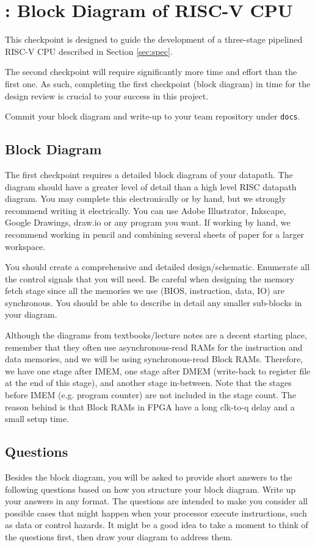 \section{\blockDiagramTaskName: Block Diagram of RISC-V CPU}

This checkpoint is designed to guide the development of a three-stage pipelined RISC-V CPU
described in Section \ref{sec:spec}.

The second checkpoint will require significantly more time and effort than the first one.
As such, completing the first checkpoint (block diagram) in time for the design review is crucial to your success in this project.

Commit your block diagram and write-up to your team repository under \verb|docs|.


\subsection{Block Diagram}
The first checkpoint requires a detailed block diagram of your datapath.
The diagram should have a greater level of detail than a high level RISC datapath diagram.
You may complete this electronically or by hand,
but we strongly recommend writing it electrically.
You can use Adobe Illustrator, Inkscape, Google Drawings, draw.io or any program you want.
If working by hand, we recommend working in pencil and combining several sheets of paper for a larger workspace.

You should create a comprehensive and detailed design/schematic.
Enumerate all the control signals that you will need.
Be careful when designing the memory fetch stage
since all the memories we use (BIOS, instruction, data, IO) are synchronous.
You should be able to describe in detail any smaller sub-blocks in your diagram.

Although the diagrams from textbooks/lecture notes are a decent starting place,
remember that they often use asynchronous-read RAMs for the instruction and data memories,
and we will be using synchronous-read Block RAMs.
Therefore, we have one stage after IMEM,
one stage after DMEM (write-back to register file at the end of this stage),
and another stage in-between.
Note that the stages before IMEM (e.g. program counter) are not included in the stage count.
The reason behind is that Block RAMs in FPGA have a long clk-to-q delay and a small setup time.


\subsection{Questions}
Besides the block diagram, you will be asked to provide short answers to the following questions based on how you structure your block diagram.
Write up your answers in any format.
The questions are intended to make you consider all possible cases that might happen when your processor execute instructions, such as data or control hazards.
It might be a good idea to take a moment to think of the questions first, then draw your diagram to address them.

